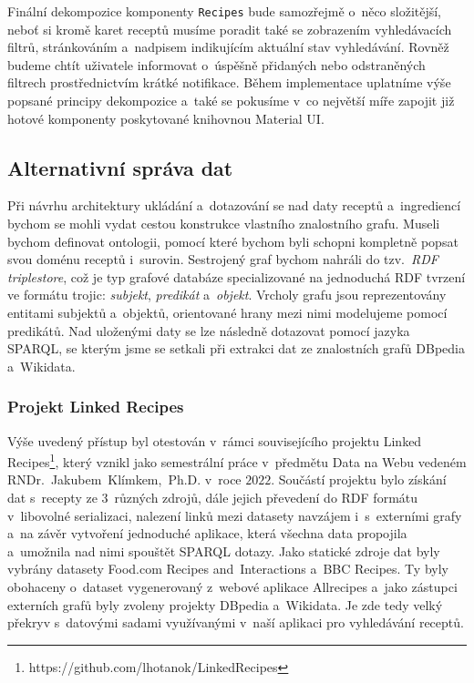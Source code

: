 Finální dekompozice komponenty \texttt{Recipes} bude samozřejmě o~něco složitější, neboť si kromě karet receptů musíme poradit také se zobrazením vyhledávacích filtrů, stránkováním a~nadpisem indikujícím aktuální stav vyhledávání. Rovněž budeme chtít uživatele informovat o~úspěšně přidaných nebo odstraněných filtrech prostřednictvím krátké notifikace. Během implementace uplatníme výše popsané principy dekompozice a~také se pokusíme v~co největší míře zapojit již hotové komponenty poskytované knihovnou Material UI.

\subsection{Alternativní správa dat}

Při návrhu architektury ukládání a~dotazování se nad daty receptů a~ingrediencí bychom se mohli vydat cestou konstrukce vlastního znalostního grafu. Museli bychom definovat ontologii, pomocí které bychom byli schopni kompletně popsat svou doménu receptů i~surovin. Sestrojený graf bychom nahráli do tzv.~\emph{RDF triplestore}, což je typ grafové databáze specializované na jednoduchá RDF tvrzení ve formátu trojic: \emph{subjekt}, \emph{predikát} a~\emph{objekt}. Vrcholy grafu jsou reprezentovány entitami subjektů a~objektů, orientované hrany mezi nimi modelujeme pomocí predikátů. Nad uloženými daty se lze následně dotazovat pomocí jazyka SPARQL, se kterým jsme se setkali při extrakci dat ze znalostních grafů DBpedia a~Wikidata.

\subsubsection{Projekt Linked Recipes}

Výše uvedený přístup byl otestován v~rámci souvisejícího projektu Linked \,Recipes\footnote{https://github.com/lhotanok/LinkedRecipes}, který vznikl jako semestrální práce v~předmětu Data na Webu vedeném RNDr.~Jakubem~Klímkem,~Ph.D. v~roce $2022$. Součástí projektu bylo získání dat s~recepty ze $3$~různých zdrojů, dále jejich převedení do RDF formátu v~libovolné serializaci, nalezení linků mezi datasety navzájem i~s~externími grafy a~na závěr vytvoření jednoduché aplikace, která všechna data propojila a~umožnila nad nimi spouštět SPARQL dotazy. Jako statické zdroje dat byly vybrány datasety Food.com Recipes and~Interactions a~BBC Recipes. Ty byly obohaceny o~dataset vygenerovaný z~webové aplikace Allrecipes a~jako zástupci externích grafů byly zvoleny projekty DBpedia a~Wikidata. Je zde tedy velký překryv s~datovými sadami využívanými v~naší aplikaci pro vyhledávání receptů.

